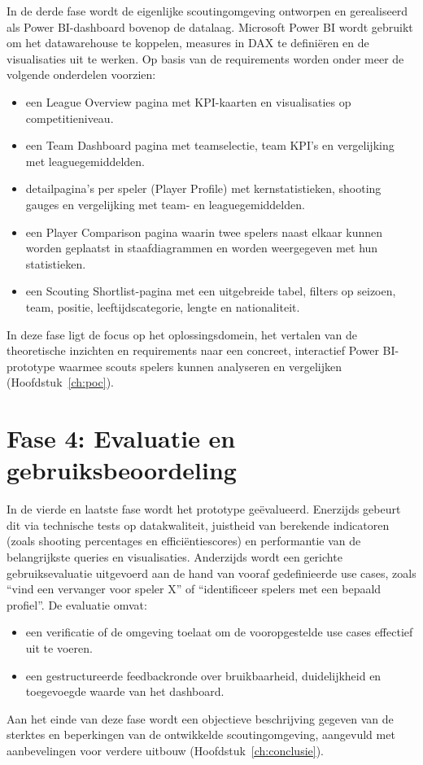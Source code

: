 In de derde fase wordt de eigenlijke scoutingomgeving ontworpen en gerealiseerd als Power BI-dashboard bovenop de datalaag. Microsoft Power BI wordt gebruikt om het datawarehouse te koppelen, measures in DAX te definiëren en de visualisaties uit te werken. Op basis van de requirements worden onder meer de volgende onderdelen voorzien:
\begin{itemize}
  \item een League Overview pagina met KPI-kaarten en visualisaties op competitieniveau.
  \item een Team Dashboard pagina met teamselectie, team KPI's en vergelijking met leaguegemiddelden.
  \item detailpagina’s per speler (Player Profile) met kernstatistieken, shooting gauges en vergelijking met team- en leaguegemiddelden.
  \item een Player Comparison pagina waarin twee spelers naast elkaar kunnen worden geplaatst in staafdiagrammen en worden weergegeven met hun statistieken.
  \item een Scouting Shortlist-pagina met een uitgebreide tabel, filters op seizoen, team, positie, leeftijdscategorie, lengte en nationaliteit.
\end{itemize}
In deze fase ligt de focus op het oplossingsdomein, het vertalen van de theoretische inzichten en requirements naar een concreet, interactief Power BI-prototype waarmee scouts spelers kunnen analyseren en vergelijken (Hoofdstuk~\ref{ch:poc}).

\section{Fase 4: Evaluatie en gebruiksbeoordeling}

In de vierde en laatste fase wordt het prototype geëvalueerd. Enerzijds gebeurt dit via technische tests op datakwaliteit, juistheid van berekende indicatoren (zoals shooting percentages en efficiëntiescores) en performantie van de belangrijkste queries en visualisaties. Anderzijds wordt een gerichte gebruiksevaluatie uitgevoerd aan de hand van vooraf gedefinieerde use cases, zoals “vind een vervanger voor speler X” of “identificeer spelers met een bepaald profiel”. De evaluatie omvat:
\begin{itemize}
  \item een verificatie of de omgeving toelaat om de vooropgestelde use cases effectief uit te voeren.
  \item een gestructureerde feedbackronde over bruikbaarheid, duidelijkheid en toegevoegde waarde van het dashboard.
\end{itemize}
Aan het einde van deze fase wordt een objectieve beschrijving gegeven van de sterktes en beperkingen van de ontwikkelde scoutingomgeving, aangevuld met aanbevelingen voor verdere uitbouw (Hoofdstuk~\ref{ch:conclusie}).

